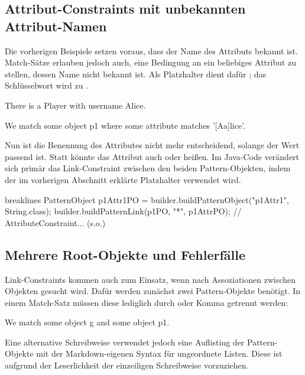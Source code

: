 \subsection{Attribut-Constraints mit unbekannten Attribut-Namen}

Die vorherigen Beispiele setzen voraus, dass der Name des Attributs bekannt ist.
Match-Sätze erlauben jedoch auch, eine Bedingung an ein beliebiges Attribut zu stellen, dessen Name nicht bekannt ist.
Als Platzhalter dient dafür ;
das Schlüsselwort  wird zu .

\begin{mdcodeblock}
    There is a Player with username Alice.

    We match some object p1 where some attribute matches '[Aa]lice'.
\end{mdcodeblock}

Nun ist die Benennung des Attributes nicht mehr entscheidend, solange der Wert passend ist.
Statt  könnte das Attribut auch  oder  heißen.
Im Java-Code verändert sich primär das Link-Constraint zwischen den beiden Pattern-Objekten, indem der im vorherigen Abschnitt erklärte Platzhalter \code{*} verwendet wird.

\begin{jcodeblock*}{breaklines}
    PatternObject p1Attr1PO = builder.buildPatternObject("p1Attr1", String.class);
    builder.buildPatternLink(p1PO, "*", p1AttrPO);
    // AttributeConstraint... (s.o.)
\end{jcodeblock*}

\subsection{Mehrere Root-Objekte und Fehlerfälle}

Link-Constraints kommen auch zum Einsatz, wenn nach Assoziationen zwischen Objekten gesucht wird.
Dafür werden zunächst zwei Pattern-Objekte benötigt.
In einem Match-Satz müssen diese lediglich durch  oder Komma getrennt werden:

\begin{mdcodeblock}
    We match some object g and some object p1.
\end{mdcodeblock}

Eine alternative Schreibweise verwendet jedoch eine Auflisting der Pattern-Objekte mit der Markdown-eigenen Syntax für ungeordnete Listen.
Diese ist aufgrund der Leserlichkeit der einzeiligen Schreibweise vorzuziehen.

